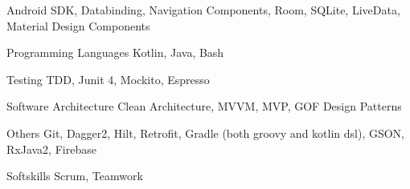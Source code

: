 
\begin{cvskills}

  \cvskill
    {Android} %
    {SDK, Databinding, Navigation Components, Room, SQLite, LiveData, Material Design Components} %

  \cvskill
    {Programming Languages} %
    {Kotlin, Java, Bash} %

  \cvskill
    {Testing} %
    {TDD, Junit 4, Mockito, Espresso} %

  \cvskill
    {Software Architecture} %
    {Clean Architecture, MVVM, MVP, GOF Design Patterns} %

  \cvskill
    {Others} %
    {Git, Dagger2, Hilt, Retrofit, Gradle (both groovy and kotlin dsl), GSON, RxJava2, Firebase} %

  \cvskill
    {Softskills} %
    {Scrum, Teamwork} %

\end{cvskills}